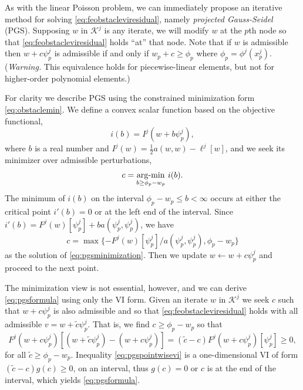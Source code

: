 \documentclass[letterpaper,final,12pt,reqno]{amsart}
\theoremstyle{claim}
\numberwithin{equation}{section}
\numberwithin{figure}{section}
\numberwithin{table}{section}
\numberwithin{theorem}{section}
\begin{document}
As with the linear Poisson problem, we can immediately propose an iterative method for solving \eqref{eq:feobstacleviresidual}, namely \emph{projected Gauss-Seidel} (PGS).  Supposing $w$ in $\mathcal{K}^j$ is any iterate, we will modify $w$ at the $p$th node so that \eqref{eq:feobstacleviresidual} holds ``at'' that node.  Note that if $w$ is admissible then $w+c\psi_p^j$ is admissible if and only if $w_p + c \ge \phi_p$ where $\phi_p = \phi^j(x_p^j)$.  (\emph{Warning.}  This equivalence holds for piecewise-linear elements, but not for higher-order polynomial elements.)

For clarity we describe PGS using the constrained minimization form \eqref{eq:obstaclemin}.  We define a convex scalar function based on the objective functional,
\begin{equation}
i(b) = I^j(w+b\psi_p^j),
\end{equation}
where $b$ is a real number and $I^j(w) = \frac{1}{2} a(w,w) - \ell^j[w]$, and we seek its minimizer over admissible perturbations,
\begin{equation}
  c = \mathop{\mathrm{arg\text{-}min}}_{b \ge \phi_p - w_p} \, i(b).  \label{eq:pgsminimization}
\end{equation}
The minimum of $i(b)$ on the interval $\phi_p - w_p \le b < \infty$ occurs at either the critical point $i'(b)=0$ or at the left end of the interval.  Since $i'(b) = F^j(w)[\psi_p^j] + b a(\psi_p^j,\psi_p^j)$, we have
\begin{equation}
  c = \max\{-F^j(w)[\psi_p^j]/a(\psi_p^j,\psi_p^j), \phi_p - w_p\}  \label{eq:pgsformula}
\end{equation}
as the solution of \eqref{eq:pgsminimization}.  Then we update $w \gets w + c\psi_p^j$ and proceed to the next point.

The minimization view is not essential, however, and we can derive \eqref{eq:pgsformula} using only the VI form.  Given an iterate $w$ in $\mathcal{K}^j$ we seek $c$ such that $w+c\psi_p^j$ is also admissible and so that \eqref{eq:feobstacleviresidual} holds with all admissible $v=w+\tilde c\psi_p^j$.  That is, we find $c\ge \phi_p-w_p$ so that
\begin{equation}
  F^j(w+c\psi_p^j)[(w+\tilde c\psi_p^j) - (w+c\psi_p^j)] = (\tilde c - c) F^j(w+c\psi_p^j)[\psi_p^j] \ge 0,  \label{eq:pgspointwisevi}
\end{equation}
for all $\tilde c\ge \phi_p-w_p$.  Inequality \eqref{eq:pgspointwisevi} is a one-dimensional VI of form $(\tilde c - c)g(c) \ge 0$, on an interval, thus $g(c)=0$ or $c$ is at the end of the interval, which yields \eqref{eq:pgsformula}.
\end{document}
